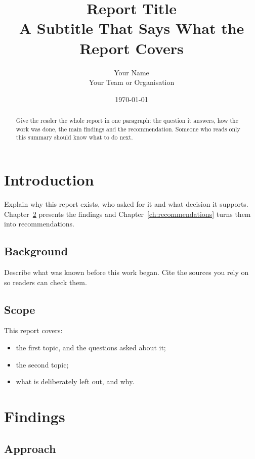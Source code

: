 \documentclass[11pt, a4paper]{report}
\title{Report Title \\[0.5em] \large A Subtitle That Says What the Report Covers}
\author{Your Name \\ \small Your Team or Organisation}
\date{\today}
\begin{document}
\maketitle

\begin{abstract}
Give the reader the whole report in one paragraph: the question it
answers, how the work was done, the main findings and the recommendation.
Someone who reads only this summary should know what to do next.
\end{abstract}

\tableofcontents

\chapter{Introduction}
\label{ch:intro}

Explain why this report exists, who asked for it and what decision it
supports. Chapter~\ref{ch:findings} presents the findings and
Chapter~\ref{ch:recommendations} turns them into recommendations.

\section{Background}
\label{sec:background}

Describe what was known before this work began. Cite the sources you rely
on~\cite{lamport1994, team2025internal} so readers can check them.

\section{Scope}
\label{sec:scope}

This report covers:
\begin{itemize}
  \item the first topic, and the questions asked about it;
  \item the second topic;
  \item what is deliberately left out, and why.
\end{itemize}

\chapter{Findings}
\label{ch:findings}

\section{Approach}
\end{document}
